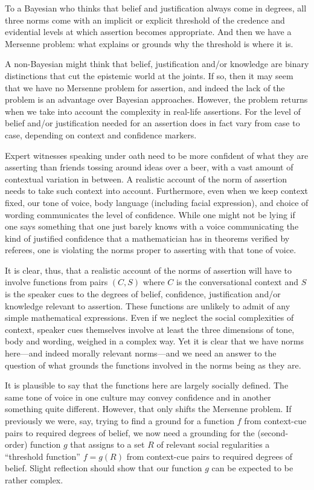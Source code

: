 To a Bayesian who thinks that belief and justification always come in degrees, all three norms come with an implicit or 
explicit threshold of the credence and evidential levels at which assertion becomes appropriate. And then we have a 
Mersenne problem: what explains or grounds why the threshold is where it is.

A non-Bayesian might think that belief, justification and/or knowledge are binary distinctions that cut the epistemic 
world at the joints. If so, then it may seem that we have no Mersenne problem for assertion, and indeed the lack of the 
problem is an advantage over Bayesian approaches. However, the problem returns when we take into account the complexity
in real-life assertions. For the level of belief and/or justification needed for an assertion does in fact vary from case to 
case, depending on context and confidence markers. 

Expert witnesses speaking under oath need to be more confident of what they are asserting than friends tossing around 
ideas over a beer, with a vast amount of contextual variation in between. A realistic account of the norm of assertion 
needs to take such context into account. Furthermore, even when we keep context fixed, our tone of voice, body language (including
facial expression), and choice of wording communicates the level of confidence. While one might not be lying if one says something that one 
just barely knows with a voice communicating the kind of justified confidence that a mathematician has in theorems verified
by referees, one is violating the norms proper to asserting with that tone of voice. 

It is clear, thus, that a realistic account of the norms of assertion will have to involve functions from pairs $(C,S)$ 
where $C$ is the conversational context and $S$ is the speaker cues to the degrees of belief, confidence, justification 
and/or knowledge relevant to assertion. These functions are unlikely to admit of any simple mathematical expressions.
Even if we neglect the social complexities of context, speaker cues themselves involve at least the three dimensions of 
tone, body and wording, weighed in a complex way. Yet it is clear that we have norms here---and indeed morally relevant norms---and we need an 
answer to the question of what grounds the functions involved in the norms being as they are.

It is plausible to say that the functions here are largely socially defined. The same tone of voice in one culture may 
convey confidence and in another something quite different. However, that only shifts the Mersenne problem. If previously
we were, say, trying to find a ground for a function $f$ from context-cue pairs to required degrees of belief, we now need
a grounding for the (second-order) function $g$ that assigns to a set $R$ of relevant social regularities a ``threshold function'' $f=g(R)$ 
from context-cue pairs to required degrees of belief. Slight reflection should show that our function $g$ can be expected to 
be rather complex. 

